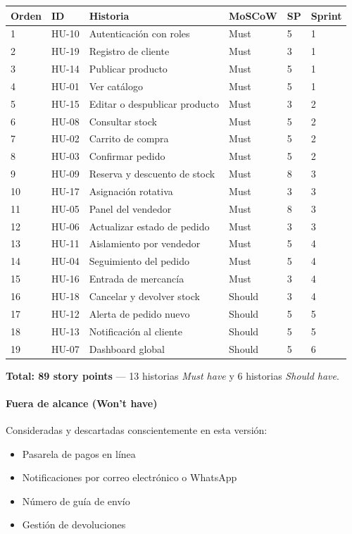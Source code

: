 \documentclass[12pt, a4paper]{article}
\begin{document}
\begin{longtable}{@{}p{1cm}p{1.3cm}p{5.2cm}p{2cm}p{1cm}p{1.3cm}@{}}
\toprule
\textbf{Orden} & \textbf{ID} & \textbf{Historia} & \textbf{MoSCoW} & \textbf{SP} & \textbf{Sprint} \\
\midrule
\endhead
1 & HU-10 & Autenticación con roles & Must & 5 & 1 \\
2 & HU-19 & Registro de cliente & Must & 3 & 1 \\
3 & HU-14 & Publicar producto & Must & 5 & 1 \\
4 & HU-01 & Ver catálogo & Must & 5 & 1 \\
5 & HU-15 & Editar o despublicar producto & Must & 3 & 2 \\
6 & HU-08 & Consultar stock & Must & 5 & 2 \\
7 & HU-02 & Carrito de compra & Must & 5 & 2 \\
8 & HU-03 & Confirmar pedido & Must & 5 & 2 \\
9 & HU-09 & Reserva y descuento de stock & Must & 8 & 3 \\
10 & HU-17 & Asignación rotativa & Must & 3 & 3 \\
11 & HU-05 & Panel del vendedor & Must & 8 & 3 \\
12 & HU-06 & Actualizar estado de pedido & Must & 3 & 3 \\
13 & HU-11 & Aislamiento por vendedor & Must & 5 & 4 \\
14 & HU-04 & Seguimiento del pedido & Must & 5 & 4 \\
15 & HU-16 & Entrada de mercancía & Must & 3 & 4 \\
16 & HU-18 & Cancelar y devolver stock & Should & 3 & 4 \\
17 & HU-12 & Alerta de pedido nuevo & Should & 5 & 5 \\
18 & HU-13 & Notificación al cliente & Should & 5 & 5 \\
19 & HU-07 & Dashboard global & Should & 5 & 6 \\
\bottomrule
\end{longtable}

\textbf{Total: 89 story points} --- 13 historias \textit{Must have} y 6 historias \textit{Should have}.

\paragraph{Fuera de alcance (Won't have)}
Consideradas y descartadas conscientemente en esta versión:
\begin{itemize}[leftmargin=*]
    \item Pasarela de pagos en línea
    \item Notificaciones por correo electrónico o WhatsApp
    \item Número de guía de envío
    \item Gestión de devoluciones
\end{itemize}
\end{document}
